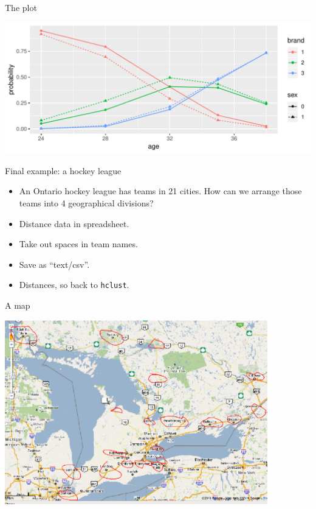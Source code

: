\begin{frame}[fragile]{The plot}
  
\begin{knitrout}
\color{fgcolor}\begin{kframe}
\begin{alltt}
\end{alltt}
\end{kframe}
\includegraphics[width=\maxwidth]{figure/unnamed-chunk-56-1} 

\end{knitrout}
\end{frame}

\begin{frame}[fragile]{Final example: a hockey league}

  \begin{itemize}
  \item 
An Ontario hockey league has teams in 21 cities. How can we arrange those teams into 4 geographical divisions?
\item Distance data in spreadsheet.
\item Take out spaces in team names.
\item Save as ``text/csv''.
  \item Distances, so back to \texttt{hclust}.


  \end{itemize}
  
\end{frame}

\begin{frame}[fragile]{A map}

\includegraphics[width=4.5in]{map1}
\end{frame}

